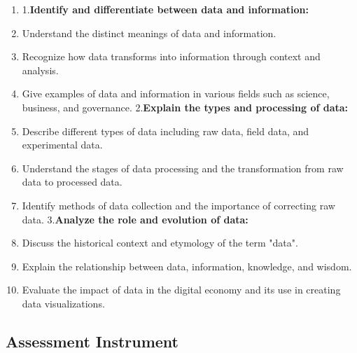 \begin{enumerate}
    \item 1.\textbf{Identify and differentiate between data and information:}
    \item Understand the distinct meanings of data and information.
    \item Recognize how data transforms into information through context and analysis.
    \item Give examples of data and information in various fields such as science, business, and governance. 2.\textbf{Explain the types and processing of data:}
    \item Describe different types of data including raw data, field data, and experimental data.
    \item Understand the stages of data processing and the transformation from raw data to processed data.
    \item Identify methods of data collection and the importance of correcting raw data. 3.\textbf{Analyze the role and evolution of data:}
    \item Discuss the historical context and etymology of the term "data".
    \item Explain the relationship between data, information, knowledge, and wisdom.
    \item Evaluate the impact of data in the digital economy and its use in creating data visualizations.
\end{enumerate}

\subsection{Assessment Instrument}

